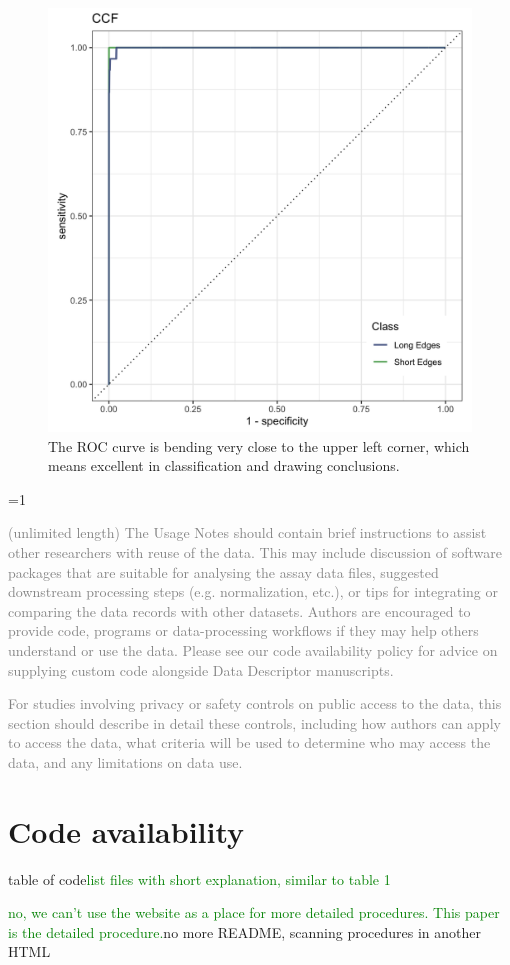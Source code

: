 \documentclass[fleqn,10pt]{wlscirep}
\newcommand{\tom}[1]{{\textcolor{RedOrange}{#1}}}
\newcommand{\hh}[1]{{\textcolor{Green}{#1}}}
\newcommand{\ifinstruction}{0} %
\begin{document}
\begin{figure}[ht]
\centering
\includegraphics[width=0.5\linewidth]{ccf_ROC.png}
\caption{The ROC curve is bending very close to the upper left corner, which means excellent in classification and drawing conclusions.}
\label{fig-ccf-ROC}
\end{figure}

\ifnum \ifinstruction=1

\textcolor{gray}{(unlimited length) The Usage Notes should contain brief instructions to assist other researchers with reuse of the data. This may include discussion of software packages that are suitable for analysing the assay data files, suggested downstream processing steps (e.g. normalization, etc.), or tips for integrating or comparing the data records with other datasets. Authors are encouraged to provide code, programs or data-processing workflows if they may help others understand or use the data. Please see our code availability policy for advice on supplying custom code alongside Data Descriptor manuscripts.}

\textcolor{gray}{For studies involving privacy or safety controls on public access to the data, this section should describe in detail these controls, including how authors can apply to access the data, what criteria will be used to determine who may access the data, and any limitations on data use.}
\fi

\section*{Code availability}\label{sec-code-availability}

\tom{table of code}\hh{list files with short explanation, similar to table 1}

\hh{no, we can't use the website as a place for more detailed procedures. This paper is the detailed procedure.}\tom{no more README, scanning procedures in another HTML}
\end{document}
